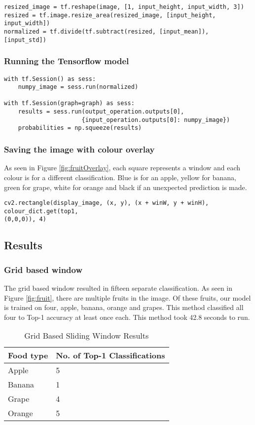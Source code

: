 \begin{lstlisting}[style=Python]
resized_image = tf.reshape(image, [1, input_height, input_width, 3])
resized = tf.image.resize_area(resized_image, [input_height, input_width])
normalized = tf.divide(tf.subtract(resized, [input_mean]), [input_std])
\end{lstlisting}

\subsubsection*{Running the Tensorflow model}
\begin{lstlisting}[style=Python]
with tf.Session() as sess:
	numpy_image = sess.run(normalized)

with tf.Session(graph=graph) as sess:
    results = sess.run(output_operation.outputs[0],
                      {input_operation.outputs[0]: numpy_image})
	probabilities = np.squeeze(results)
\end{lstlisting}

\subsubsection*{Saving the image with colour overlay}
As seen in Figure \ref{fig:fruitOverlay}, each square represents a window and
each colour is for a different classification. Blue is for an apple, yellow for
banana, green for grape, white for orange and black if an unexpected prediction
is made.

\begin{lstlisting}[style=Python]
cv2.rectangle(display_image, (x, y), (x + winW, y + winH), colour_dict.get(top1,
(0,0,0)), 4)
\end{lstlisting}

\subsection*{Results}
\subsubsection*{Grid based window}
The grid based window resulted in fifteen separate classification. As seen in Figure
\ref{fig:fruit}, there are multiple fruits in the image. Of these fruits, our
model is trained on four, apple, banana, orange and grapes. This method
classified all four to Top-1 accuracy at least once each. This method took 42.8
seconds to run.

\begin{table}[]
	\centering
	\caption{Grid Based Sliding Window Results}
	\label{my-label}
	\begin{tabular}{|l|l|}
	\hline
		\textbf{Food type} & \textbf{No. of Top-1 Classifications} \\ \hline
		Apple     & 5                      \\ \hline
		Banana    & 1                      \\ \hline
		Grape     & 4                      \\ \hline
		Orange    & 5                     \\ \hline
	\end{tabular}
\end{table}

